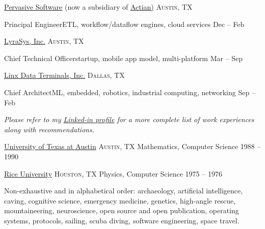 \documentclass[10pt,letterpaper]{article}
\begin{document}
	\vspace*{1em}
	\headedsection
	{\href{http://www.pervasive.com/}{Pervasive Software} (now a subsidiary of \href{https://www.actian.com/}{Actian)}}
	{\textsc{Austin, TX}} {%
				
		\headedsubsection
		{Principal Engineer\sbull\textsf{ETL, workflow/dataflow engines, cloud services}}
		{Dec  -- Feb }

	}
					
	\vspace*{1em}
	\headedsection
	{\href{http://lyrasys.com}{LyraSys, Inc.}}
	{\textsc{Austin, TX}} {%
						
		\headedsubsection
		{Chief Technical Officer\sbull\textsf{startup, mobile app model, multi-platform}}
		{Mar  -- Sep }

	}
						
	\vspace*{1em}
	\headedsection
	{\href{http://www.linxdata.com/}{Linx Data Terminals, Inc.}}
	{\textsc{Dallas, TX}} {%
							
		\headedsubsection
		{Chief Architect\sbull\textsf{ML, embedded, robotics, industrial computing, networking}}
		{Sep  -- Feb }

	}
							
	\vspace{-0.2em}
	\begin{center}
		\emph{\small Please refer to my \href{http://www.linkedin.com/in/jfogarty}{Linked-in profile} for a more complete list of work experiences along with recommendations.}
	\end{center}

\spacedhrule{0.5em}{-0.4em}


\headedsection
{\href{https://www.utexas.edu/}{University of Texas at Austin}}
{\textsc{Austin, TX}} {%
	\headedsubsection
	{Mathematics, Computer Science}
	{1988 -- 1990} {}
}

\headedsection
{\href{http://www.rice.edu/}{Rice University}}
{\textsc{Houston, TX}} {%
	\headedsubsection
	{Physics, Computer Science}
	{1975 -- 1976} {}
}


\vspace{1em}\spacedhrule{-0.2em}{-0.4em}


\inlineheadsection
  {Non-exhaustive and in alphabetical order:}
  {archaeology, artificial intelligence, caving, cognitive science, emergency medicine, genetics, high-angle rescue, mountaineering, neuroscience, open source and open publication, operating systems, protocols, sailing, scuba diving, software engineering, space travel.}
\end{document}
